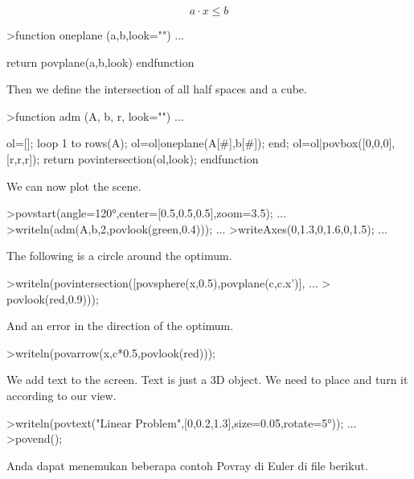 \documentclass[a4paper,10pt]{article}
\begin{document}
\begin{eulernotebook}
\begin{eulercomment}
\end{eulercomment}
\begin{eulerformula}
\[
a \cdot x \le b
\]
\end{eulerformula}
\begin{eulerprompt}
>function oneplane (a,b,look="") ...
\end{eulerprompt}
\begin{eulerudf}
    return povplane(a,b,look)
  endfunction
\end{eulerudf}
\begin{eulercomment}
Then we define the intersection of all half spaces and a cube.
\end{eulercomment}
\begin{eulerprompt}
>function adm (A, b, r, look="") ...
\end{eulerprompt}
\begin{eulerudf}
    ol=[];
    loop 1 to rows(A); ol=ol|oneplane(A[#],b[#]); end;
    ol=ol|povbox([0,0,0],[r,r,r]);
    return povintersection(ol,look);
  endfunction
\end{eulerudf}
\begin{eulercomment}
We can now plot the scene.
\end{eulercomment}
\begin{eulerprompt}
>povstart(angle=120°,center=[0.5,0.5,0.5],zoom=3.5); ...
>writeln(adm(A,b,2,povlook(green,0.4))); ...
>writeAxes(0,1.3,0,1.6,0,1.5); ...
\end{eulerprompt}
\begin{eulercomment}
The following is a circle around the optimum.
\end{eulercomment}
\begin{eulerprompt}
>writeln(povintersection([povsphere(x,0.5),povplane(c,c.x')], ...
>  povlook(red,0.9)));
\end{eulerprompt}
\begin{eulercomment}
And an error in the direction of the optimum.
\end{eulercomment}
\begin{eulerprompt}
>writeln(povarrow(x,c*0.5,povlook(red)));
\end{eulerprompt}
\begin{eulercomment}
We add text to the screen. Text is just a 3D object. We need to place
and turn it according to our view.
\end{eulercomment}
\begin{eulerprompt}
>writeln(povtext("Linear Problem",[0,0.2,1.3],size=0.05,rotate=5°)); ...
>povend();
\end{eulerprompt}
\begin{eulercomment}
Anda dapat menemukan beberapa contoh Povray di Euler di file berikut.



\end{eulercomment}
\end{eulernotebook}
\end{document}
